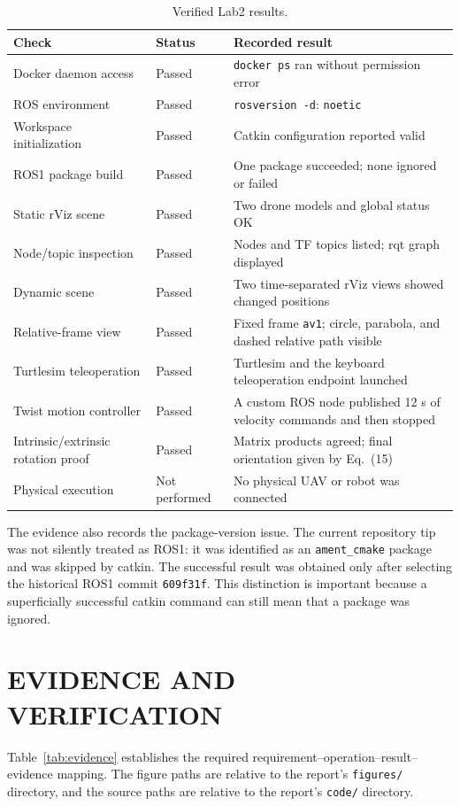 \documentclass[letterpaper, 10 pt, conference]{ieeeconf}
\begin{document}
\begin{table}[t]
\caption{Verified Lab2 results.}
\label{tab:results}
\centering
\footnotesize
\setlength{\tabcolsep}{2pt}
\begin{tabular}{p{}p{}p{}}
\toprule
Check & Status & Recorded result \\
\midrule
Docker daemon access & Passed & \texttt{docker ps} ran without permission error \\
ROS environment & Passed & \texttt{rosversion -d}: \texttt{noetic} \\
Workspace initialization & Passed & Catkin configuration reported valid \\
ROS1 package build & Passed & One package succeeded; none ignored or failed \\
Static rViz scene & Passed & Two drone models and global status OK \\
Node/topic inspection & Passed & Nodes and TF topics listed; rqt graph displayed \\
Dynamic scene & Passed & Two time-separated rViz views showed changed positions \\
Relative-frame view & Passed & Fixed frame \texttt{av1}; circle, parabola, and dashed relative path visible \\
Turtlesim teleoperation & Passed & Turtlesim and the keyboard teleoperation endpoint launched \\
Twist motion controller & Passed & A custom ROS node published 12 s of velocity commands and then stopped \\
Intrinsic/extrinsic rotation proof & Passed & Matrix products agreed; final orientation given by Eq.~(15) \\
Physical execution & Not performed & No physical UAV or robot was connected \\
\bottomrule
\end{tabular}
\end{table}

The evidence also records the package-version issue. The current repository tip was not silently treated as ROS1: it was identified as an \texttt{ament\_cmake} package and was skipped by catkin. The successful result was obtained only after selecting the historical ROS1 commit \texttt{609f31f}. This distinction is important because a superficially successful catkin command can still mean that a package was ignored.

\section{EVIDENCE AND VERIFICATION}
\label{sec:evidence}
Table~\ref{tab:evidence} establishes the required requirement--operation--result--evidence mapping. The figure paths are relative to the report's \texttt{figures/} directory, and the source paths are relative to the report's \texttt{code/} directory.
\end{document}
